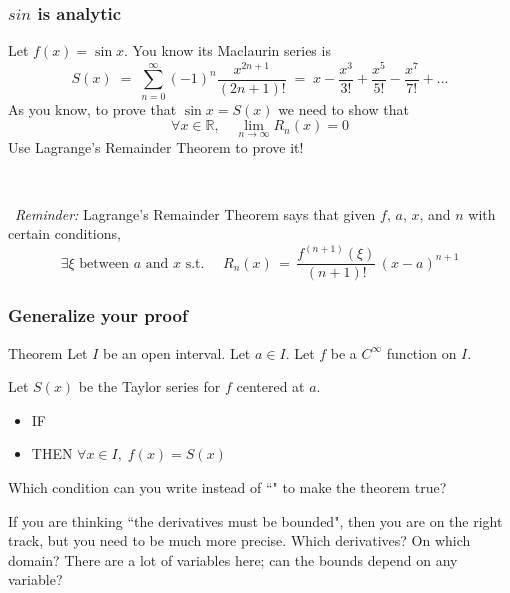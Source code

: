 \documentclass[14pt]{beamer}
\newcommand{\R}{\mathbb{R}}
\newcommand{\p}{\pause}
\newcommand{\setsize}[1]{\fontsize{#1}{#1}\selectfont} %
\newcommand{\smallerfont}{\setsize{13}} %
\newcommand{\vvv}{\vspace{.2cm}}
\begin{document}
	\begin{frame}
		\smallerfont
		\frametitle{$sin$ is analytic}

		Let ${\displaystyle f(x) = \sin x}$. You know its Maclaurin series is
		\[
			S(x) \; =\; \sum_{n=0}^{\infty}(-1)^{n} \frac{x^{2n+1}}{(2n+1)!}\; = \; x -
			\frac{x^{3}}{3!}+ \frac{x^{5}}{5!}- \frac{x^{7}}{7!}+ \ldots
		\]
		As you know, to prove that ${\displaystyle \sin x = S(x)}$ we need to show
		that
		\[
			\forall x \in \R, \quad \lim_{n \to \infty}R_{n}(x) = 0
		\]
		Use Lagrange's Remainder Theorem to prove it!

		\
 \hrulefill \p

		\
 \emph{Reminder:} Lagrange's Remainder Theorem says that given $f$, $a$,
		$x$, and $n$ with certain conditions,
		\begin{equation*}
			\exists \xi \mbox{ between $a$ and $x$ s.t. }\quad R_{n}(x) \, = \, \frac{f^{(n+1)}(\xi)}{(n+1)!}
			\, (x-a)^{n+1}
		\end{equation*}
	\end{frame}
	\begin{frame}[t]
		\smallerfont
		\frametitle{Generalize your proof}

		\begin{block}{Theorem}
			Let $I$ be an open interval. Let $a \in I$. Let $f$ be a $C^{\infty}$ function
			on $I$.

			Let $S(x)$ be the Taylor series for $f$ centered at $a$.

			\begin{itemize}
				\item IF 

				\item THEN ${\displaystyle \forall x \in I, \; f(x) = S(x)}$
			\end{itemize}
		\end{block}
		\vvv

		Which condition can you write instead of ``" to make the theorem true?

		\p \vvv

		If you are thinking ``the derivatives must be bounded", then you are on the
		right track, but you need to be much more precise. Which derivatives? On which
		domain? There are a lot of variables here; can the bounds depend on any variable?
	\end{frame}
\end{document}
